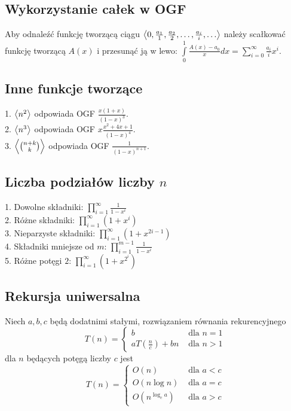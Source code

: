 \subsection*{Wykorzystanie całek w OGF}
Aby odnaleźć funkcję tworzącą ciągu 
$\left\langle 0, \frac{a_1}{1}, \frac{a_2}{2}, \ldots, \frac{a_i}{i}, \ldots \right\rangle$ należy
scałkować funkcję tworzącą $A(x)$ i przesunąć ją w lewo:
$\int\limits_{0}^{1} \frac{A(x) - a_0}{x} dx = 
\sum\limits_{i=0}^{\infty} \frac{a_i}{i} x^{i}$.

\subsection*{Inne funkcje tworzące}
1. $\left\langle n^2 \right\rangle$ odpowiada OGF $\frac{x(1+x)}{(1-x)^3}$. \\
2. $\left\langle n^3 \right\rangle$ odpowiada OGF $x \frac{x^2 + 4x + 1}{(1-x)^4}$. \\
3. $\left\langle \binom{n+k}{k} \right\rangle$ odpowiada OGF $\frac{1}{(1-x)^{n+1}}$.

\subsection*{Liczba podziałów liczby $n$}
1. Dowolne składniki: $\prod\limits_{i=1}^{\infty} \frac{1}{1 - x^i}$ \\
2. Różne składniki: $\prod\limits_{i=1}^{\infty} (1 + x^i)$ \\
3. Nieparzyste składniki: $\prod\limits_{i=1}^{\infty} (1 + x^{2i-1})$ \\
4. Składniki mniejsze od $m$: $\prod\limits_{i=1}^{m-1} \frac{1}{1 - x^i}$ \\
5. Różne potęgi $2$: $\prod\limits_{i=1}^{\infty} (1 + x^{2^i})$

\subsection*{Rekursja uniwersalna}
Niech $a, b, c$ będą dodatnimi stałymi, rozwiązaniem równania rekurencyjnego
$$
T(n) =
\begin{cases}
    b                    &\text{ dla } n = 1\\
    aT(\frac{n}{c}) + bn &\text{ dla } n > 1
\end{cases}
$$
dla $n$ będących potęgą liczby $c$ jest
$$
T(n) =
\begin{cases}
    O(n)                         &\text{ dla } a < c \\
    O(n \log n)                  &\text{ dla } a = c \\
    O\left( n^{\log_c a} \right) &\text{ dla } a > c
\end{cases}
$$